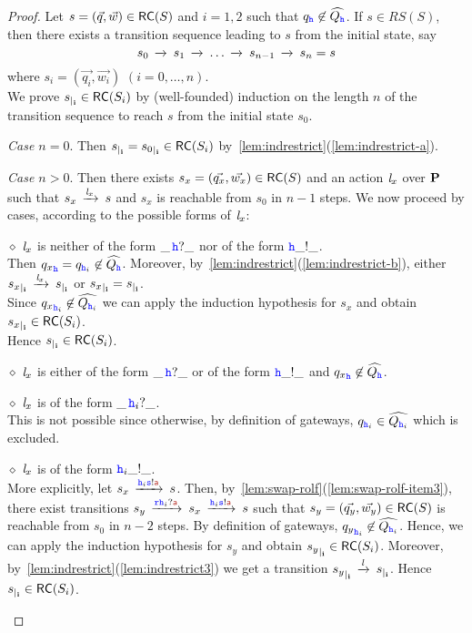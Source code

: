 \begin{proof}
Let $s = (\vec{q},\vec{w}) \in \mathsf{RC}(S)$ and $i=1,2$ such that ${q}_{{\mathtt{\color{blue}{ {h}}}}}\not\in\widehat{Q_{{\mathtt{\color{blue}{ {h}}}}}}$.
If $s \in RS(S)$, then there exists a transition sequence leading to $s$ from the initial state, say
$$s_0\,\xrightarrow{}_{{}}\,s_1\,\xrightarrow{}_{{}}\, \ldots\,\xrightarrow{}_{{}}\, s_{n-1}\,\xrightarrow{}_{{}}\,s_n=s$$
where $s_i = (\vec{q_i},\vec{w_i})$ $(i=0,\ldots,n)$.\\
We prove ${s}_{\mid_{\mathbf{i}}}\in \mathsf{RC}(S_i)$  by (well-founded) induction on the length $n$ of the transition sequence to reach $s$ from the initial state $s_0$.

{\em Case $n=0$}. Then ${s}_{\mid_{\mathbf{i}}} = {s_0}_{\mid_{\mathbf{i}}} \in \mathsf{RC}(S_i)$
by~\cref{lem:indrestrict}(\ref{lem:indrestrict-a}).


{\em Case $n>0$}.
Then there exists $s_x = (\vec{q_x},\vec{w_x}) \in \mathsf{RC}(S)$ and an action $\mathit{l}_x$ over $\mathbf{P}$
such that $s_x\,\xrightarrow{\mathit{l}_x}_{{}}\,s$ and $s_x$ is reachable from $s_0$ in $n-1$ steps.
We now proceed by cases, according to the possible forms of $\mathit{l}_x$:

\begin{description}
%
\item
\underline{$\diamond$}
$\mathit{l}_x$ is neither of the form $\_\,{\mathtt{\color{blue}{ {h}}}}?\_$ nor of the form ${\mathtt{\color{blue}{ {h}}}}\_!\_$.\\
Then ${q_x}_{{\mathtt{\color{blue}{ {h}}}}}={q}_{{\mathtt{\color{blue}{ {h}}}}_i}\not\in\widehat{Q_{{\mathtt{\color{blue}{ {h}}}}}}$.
Moreover, by~\cref{lem:indrestrict}(\ref{lem:indrestrict-b}),
either ${s_x}_{\mid_{\mathbf{i}}}\,\xrightarrow{\mathit{l}_x}_{{}}\,{s}_{\mid_{\mathbf{i}}}$ or  ${s_x}_{\mid_{\mathbf{i}}}={s}_{\mid_{\mathbf{i}}}$.\\
Since ${q_x}_{{\mathtt{\color{blue}{ {h}}}}_i}\not\in\widehat{Q_{{\mathtt{\color{blue}{ {h}}}}_i}}$ we can apply the induction hypothesis for $s_x$ and obtain ${s_x}_{\mid_{\mathbf{i}}}\in \mathsf{RC}(S_i)$.\\
Hence ${s}_{\mid_{\mathbf{i}}}\in \mathsf{RC}(S_i)$.
%
\item
\underline{$\diamond$}
$\mathit{l}_x$ is either of the form $\_\,{\mathtt{\color{blue}{ {h}}}}?\_$ or of the form ${\mathtt{\color{blue}{ {h}}}}\_!\_$
and ${q_x}_{\mathtt{\color{blue}{ {h}}}}\not\in\widehat{Q_{{\mathtt{\color{blue}{ {h}}}}}}$.

%
\item
\underline{$\diamond$}
$\mathit{l}_x$ is of the form $\_\,{\mathtt{\color{blue}{ {h}}}}_i?\_$.\\
This is not possible since otherwise,
by definition of gateways,
${q}_{{\mathtt{\color{blue}{ {h}}}}_i}\in\widehat{Q_{{\mathtt{\color{blue}{ {h}}}}_i}}$ which is excluded. 
%
\item
\underline{$\diamond$}
$\mathit{l}_x$ is of the form ${\mathtt{\color{blue}{ {h}}}}_i\_!\_$.\\
More explicitly, let $s_x\lts{\HH_i\tts!\msg[a]}s$.
Then, by~\cref{lem:swap-rolf}(\ref{lem:swap-rolf-item3}), there exist
transitions
$s_y \lts{\ttr\HH_i?\msg[a]}s_x\lts{\HH_i\tts!\msg[a]}s$
such that $s_y = (\vec{q_y},\vec{w_y})\in \mathsf{RC}(S)$ is reachable from $s_0$ in $n-2$ steps. By definition of gateways, ${q_y}_{{\mathtt{\color{blue}{ {h}}}}_i} \not\in\widehat{Q_{{\mathtt{\color{blue}{ {h}}}}_i}}$.
Hence, we can apply the induction hypothesis for $s_y$ and obtain ${s_y}_{\mid_{\mathbf{i}}}\in \mathsf{RC}(S_i)$.
Moreover, by~\cref{lem:indrestrict}(\ref{lem:indrestrict3}) we get a transition
${s_y}_{\mid_{\mathbf{i}}}\,\xrightarrow{\mathit{l}}_{{}}\,{s}_{\mid_{\mathbf{i}}}$. Hence ${s}_{\mid_{\mathbf{i}}}\in \mathsf{RC}(S_i)$.
\end{description}


\end{proof}
